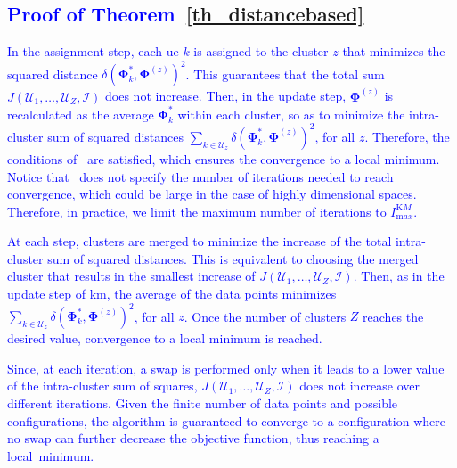 \textcolor{blue}{
\appendix
\section*{Proof of Theorem~\ref{th_distancebased}}
\begin{IEEEproof}
    In the assignment step, each \gls{ue} $k$ is assigned to the cluster $z$ that minimizes the squared distance $\delta\left(\bm{\Phi}_k^*, \bm{\Phi}^{(z)}\right)^2$. This guarantees that the total sum $J(\mathcal{U}_1,\ldots,\mathcal{U}_{Z},\mathcal{I})$ does not increase. 
    Then, in the update step, $\bm{\Phi}^{(z)}$ is recalculated as the average $\bm{\Phi}_k^*$ within each cluster, so as to minimize the intra-cluster sum of squared distances $\sum_{k \in \mathcal{U}_z}\delta\left(\bm{\Phi}_k^*, \bm{\Phi}^{(z)}\right)^2$, for all $z$.
    Therefore, the conditions of~\cite[Lemma 5]{Sabin1986Global} are satisfied, which ensures the convergence to a local minimum. Notice that~\cite{Sabin1986Global} does not specify the number of iterations needed to reach convergence, which could be large in the case of highly dimensional spaces. Therefore, in practice, we limit the maximum number of iterations to $I_{\mathrm max}^{\mathrm KM}$.
\end{IEEEproof}
\begin{IEEEproof}
    At each step, clusters are merged to minimize the increase of the total intra-cluster sum of squared distances. This is equivalent to choosing the merged cluster that results in the smallest increase of $J(\mathcal{U}_1,\ldots,\mathcal{U}_{Z},\mathcal{I})$.
    Then, as in the update step of \gls{km}, the average of the data points minimizes $\sum_{k \in \mathcal{U}_z}\delta\left(\bm{\Phi}_k^*, \bm{\Phi}^{(z)}\right)^2$, for all $z$. Once the number of clusters $Z$ reaches the desired value, convergence to a local minimum is reached.
\end{IEEEproof}
\begin{IEEEproof}
    Since, at each iteration, a swap is performed only when it leads to a lower value of the intra-cluster sum of squares, $J(\mathcal{U}_1,\ldots,\mathcal{U}_{Z},\mathcal{I})$ does not increase over different iterations. Given the finite number of data points and possible configurations, the algorithm is guaranteed to converge to a configuration where no swap can further decrease the objective function, thus reaching a local~minimum.
\end{IEEEproof}
}